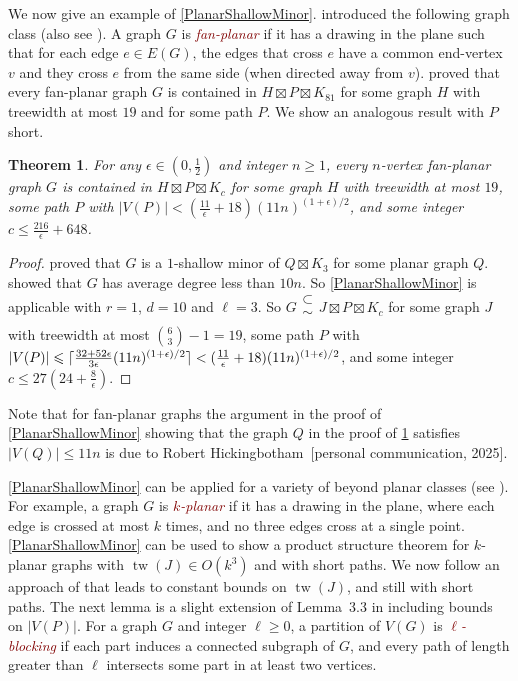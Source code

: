 \documentclass[11pt]{article}
\newcommand{\defn}[1]{\textcolor{Maroon}{\emph{#1}}}
\DeclarePairedDelimiter{\ceil}{\lceil}{\rceil}
\renewcommand{\geq}{\geqslant}
\renewcommand{\leq}{\leqslant}
\newcommand{\subsetsim}{\mathrel{\substack{\textstyle\subset\\[-0.3ex]\textstyle\sim\\[-0.4ex]}}}
\DeclareMathOperator{\tw}{tw}
\theoremstyle{plain}
\newtheorem{thm}{Theorem}
\theoremstyle{definition}
\begin{document}
		We now give an example of \cref{PlanarShallowMinor}. \citet{KU22} introduced the following graph class (also see \citep{BG20,CPS22}). A graph $G$ is \defn{fan-planar} if it has a drawing in the plane such that for each edge $e \in  E ( G )$, the edges that cross $e$ have a common end-vertex $v$ and they cross $e$ from the same side (when directed away from $v$). \citet{HW24} proved that every fan-planar graph $G$ is contained in $H \boxtimes P \boxtimes K_{81}$ for some graph $H$ with treewidth at most $19$ and for some path $P$. We show an analogous result with $P$ short. 
		
		\begin{thm}
        \label{FanPlanarProduct}
		For any $\epsilon\in (0,\frac12)$ and integer $n\geq 1$, every $n$-vertex fan-planar graph $G$ is contained in $H \boxtimes P \boxtimes K_{c}$ for some graph $H$ with treewidth at most $19$, some path $P$ with $|V(P)|< 	(\tfrac{11}{\epsilon}+18) (11n)^{(1+\epsilon)/2}$, and some integer $c\leq
        \frac{216}{\epsilon}+648$. 
		\end{thm}
		
		\begin{proof}
		\citet[Lemma~33]{HW24} proved that $G$ is a $1$-shallow minor of $Q \boxtimes K_3$ for some planar graph $Q$. \citet{KU22} showed that $G$ has average degree less than $10n$. So \cref{PlanarShallowMinor} is applicable with $r=1$, $d=10$ and $\ell=3$. So $G \subsetsim J \boxtimes P \boxtimes K_{c}$ for some graph $J$ with treewidth at most $\binom{6}{3}-1=19$, some path $P$ with $|V(P)|\leq 	\ceil{\tfrac{32+52\epsilon}{3\epsilon} (11n)^{(1+\epsilon)/2}}< (\tfrac{11}{\epsilon}+18) (11n)^{(1+\epsilon)/2}$, and some integer 
        $c\leq 27(24+\frac{8}{\epsilon})$.
        \end{proof}

Note that for fan-planar graphs the argument in 
the proof of \cref{PlanarShallowMinor} showing that the graph $Q$ in the proof of \cref{FanPlanarProduct} 
satisfies $|V(Q)|\leq 11n$ is due to Robert Hickingbotham~[personal communication, 2025]. 

\cref{PlanarShallowMinor} can be applied for a variety of beyond planar classes (see \citep{HW24}). For example, a graph $G$ is \defn{$k$-planar} if it has a drawing in the plane, where each edge is crossed at most $k$ times, and no three edges cross at a single point. \cref{PlanarShallowMinor} can be used to show a product structure theorem for $k$-planar graphs with $\tw(J)\in O(k^3)$ and with short paths. We now follow an approach of \citet{DHSW24} that leads to constant bounds on  $\tw(J)$, and still with short paths. The next lemma is a slight extension of Lemma~3.3 in \citep{DHSW24} including bounds on $|V(P)|$. For a graph $G$  and integer $\ell\geq 0$, a partition of $V(G)$ is \defn{$\ell$-blocking} if each part induces a connected subgraph of $G$, and every path of length greater than $\ell$ intersects some part in at least two vertices.
\end{document}
